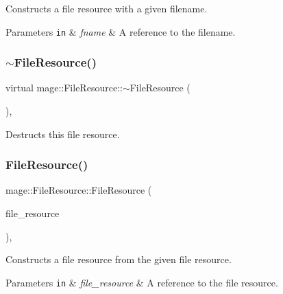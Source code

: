 Constructs a file resource with a given filename.


\begin{DoxyParams}[1]{Parameters}
\mbox{\tt in}  & {\em fname} & A reference to the filename. \\
\hline
\end{DoxyParams}
\hypertarget{classmage_1_1_file_resource_a91ed639ff33311ebdfb54c80be7d6f62}{}\label{classmage_1_1_file_resource_a91ed639ff33311ebdfb54c80be7d6f62} 
\subsubsection{\texorpdfstring{$\sim$\+File\+Resource()}{~FileResource()}}
{\footnotesize\ttfamily virtual mage\+::\+File\+Resource\+::$\sim$\+File\+Resource (\begin{DoxyParamCaption}{ }\end{DoxyParamCaption})\hspace{0.3cm}{\ttfamily [virtual]}, {\ttfamily [default]}}

Destructs this file resource. \hypertarget{classmage_1_1_file_resource_a5aa20ee42fcfc4ee6877438ed7377930}{}\label{classmage_1_1_file_resource_a5aa20ee42fcfc4ee6877438ed7377930} 
\subsubsection{\texorpdfstring{File\+Resource()}{FileResource()}\hspace{0.1cm}{\footnotesize\ttfamily [2/3]}}
{\footnotesize\ttfamily mage\+::\+File\+Resource\+::\+File\+Resource (\begin{DoxyParamCaption}\item[{const \hyperlink{classmage_1_1_file_resource}{File\+Resource} \&}]{file\+\_\+resource }\end{DoxyParamCaption})\hspace{0.3cm}{\ttfamily [private]}, {\ttfamily [delete]}}

Constructs a file resource from the given file resource.


\begin{DoxyParams}[1]{Parameters}
\mbox{\tt in}  & {\em file\+\_\+resource} & A reference to the file resource. \\
\hline
\end{DoxyParams}
\hypertarget{classmage_1_1_file_resource_a18b14768cb233c20ae191bf0ad8ed2db}{}\label{classmage_1_1_file_resource_a18b14768cb233c20ae191bf0ad8ed2db} 

